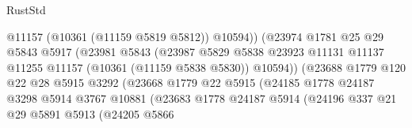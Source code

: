 \begin{lexlean}{RustStd}
\begin{coremodule}
                                          @11157
                                          (@10361 (@11159 @5819 @5812))
                                          @10594))
                                      (@23974
                                        @1781
                                        @25
                                        @29
                                        @5843
                                        @5917
                                        (@23981
                                          @5843
                                          (@23987
                                            @5829
                                            @5838
                                            @23923
                                            @11131
                                            @11137
                                            @11255
                                            @11157
                                            (@10361 (@11159 @5838 @5830))
                                            @10594))
                                        (@23688
                                          @1779
                                          @120
                                          @22
                                          @28
                                          @5915
                                          @3292
                                          (@23668
                                            @1779
                                            @22
                                            @5915
                                            (@24185
                                              @1778
                                              @24187
                                              @3298
                                              @5914
                                              @3767
                                              @10881
                                              (@23683
                                                @1778
                                                @24187
                                                @5914
                                                (@24196
                                                  @337
                                                  @21
                                                  @29
                                                  @5891
                                                  @5913
                                                  (@24205
                                                    @5866

\end{coremodule}
\end{lexlean}
